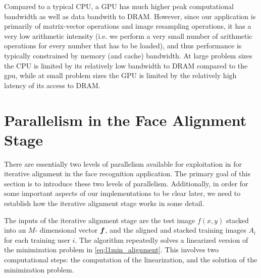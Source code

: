 \documentclass[10pt,twocolumn,letterpaper]{article}
\begin{document}
Compared to a typical CPU, a GPU has much higher peak computational bandwidth
as well as data bandwith to DRAM.  However, since our application is primarily
of matrix-vector operations and image resampling operations, it has a very low
arithmetic intensity (i.e. we perform a very small number of arithmetic
operations for every number that has to be loaded), and thus performance is
typically constrained by memory (and cache) bandwidth.  At large problem sizes
the CPU is limited by its relatively low bandwidth to DRAM compared to the gpu,
while at small problem sizes the GPU is limited by the relatively high latency
of its access to DRAM. 

\section{Parallelism in the Face Alignment Stage}
\label{sec:alignment}
There are essentially two levels of parallelism available for exploitation in
for iterative alignment in the face recognition application.  The primary goal
of this section is to introduce these two levels of parallelism.  Additionally,
in order for some important aspects of our implementations to be clear later,
we need to establish how the iterative alignment stage works in some
detail.

The inputs of the iterative alignment stage are the test image $f(x,y)$ stacked into an $M$-
dimensional vector $\boldsymbol{f}$, and the aligned and stacked training images $A_i$ for
each training user $i$. 
The algorithm repeatedly solves a linearized version of the minimization problem
in \eqref{eq:l1min_alignment}.  This involves two computational steps:
the computation of the linearization, and the solution of the minimization problem.
\end{document}
